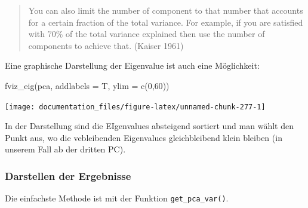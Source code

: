 \documentclass[
]{article}
\newenvironment{Shaded}{\begin{snugshade}}{\end{snugshade}}
\newcommand{\AttributeTok}[1]{\textcolor[rgb]{0.77,0.63,0.00}{#1}}
\newcommand{\DecValTok}[1]{\textcolor[rgb]{0.00,0.00,0.81}{#1}}
\newcommand{\DocumentationTok}[1]{\textcolor[rgb]{0.56,0.35,0.01}{\textbf{\textit{#1}}}}
\newcommand{\FunctionTok}[1]{\textcolor[rgb]{0.00,0.00,0.00}{#1}}
\newcommand{\NormalTok}[1]{#1}
\newcommand{\OtherTok}[1]{\textcolor[rgb]{0.56,0.35,0.01}{#1}}
\begin{document}
\begin{quote}
You can also limit the number of component to that number that accounts for a certain fraction of the total variance. For example, if you are satisfied with 70\% of the total variance explained then use the number of components to achieve that. (Kaiser 1961)
\end{quote}

Eine graphische Darstellung der Eigenvalue ist auch eine Möglichkeit:

\begin{Shaded}
\begin{Highlighting}[]

\FunctionTok{fviz\_eig}\NormalTok{(pca, }\AttributeTok{addlabels =}\NormalTok{ T, }\AttributeTok{ylim =} \FunctionTok{c}\NormalTok{(}\DecValTok{0}\NormalTok{,}\DecValTok{60}\NormalTok{))}
\end{Highlighting}
\end{Shaded}

\begin{center}\texttt{[image: documentation\_files/figure-latex/unnamed-chunk-277-1]} \end{center}

In der Darstellung sind die EIgenvalues absteigend sortiert und man wählt den Punkt aus, wo die vebleibenden Eigenvalues gleichbleibend klein bleiben (in unserem Fall ab der dritten PC).

\hypertarget{darstellen-der-ergebnisse}{%
\subsubsection{Darstellen der Ergebnisse}\label{darstellen-der-ergebnisse}}

Die einfachste Methode ist mit der Funktion \texttt{get\_pca\_var()}.

\begin{Shaded}
\end{Shaded}
\end{document}
